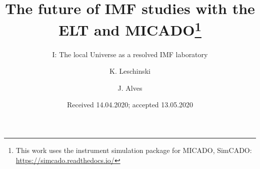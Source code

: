 \documentclass{aa}
\begin{document}
  \title{The future of IMF studies with the ELT and MICADO\thanks{This work uses the instrument simulation package for MICADO, SimCADO: \url{https://simcado.readthedocs.io/}}}
  \subtitle{I: The local Universe as a resolved IMF laboratory}
  \author{K. Leschinski
     \and
          J. Alves
     }


  \date{Received 14.04.2020; accepted 13.05.2020}

\end{document}
